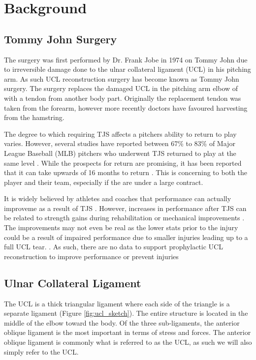 \section {Background}

\subsection{Tommy John Surgery}

The surgery was first performed by Dr. Frank Jobe in 1974 on Tommy John due to irreversible damage done to the ulnar collateral ligament (UCL) in his pitching arm. As such UCL reconstruction surgery has become known as Tommy John surgery. The surgery replaces the damaged UCL in the pitching arm elbow of with a tendon from another body part. Originally the replacement tendon was taken from the forearm, however more recently doctors have favoured harvesting from the hamstring.

The degree to which requiring TJS affects a pitchers ability to return to play varies. However, several studies have reported between 67\% to 83\% of Major League Baseball (MLB) pitchers who underwent TJS returned to play at the same level \cite{Erickson2014} \cite{Cain2010} \cite{Makhni2014}. While the prospects for return are promising, it has been reported that it can take upwards of 16 months to return \cite{Makhni2014}. This is concerning to both the player and their team, especially if the are under a large contract.

It is widely believed by athletes and coaches that performance can actually improveme as a result of TJS \cite{Conte2015}. However, increases in performance after TJS can be related to strength gains during rehabilitation or mechanical improvements \cite{Cain2010}. The improvements may not even be real as the lower stats prior to the injury could be a result of impaired performance due to smaller injuries leading up to a full UCL tear. \cite{Makhni2014}. As such, there are no data to support prophylactic UCL reconstruction to improve performance or prevent injuries \cite{Erickson2014}

\subsection{Ulnar Collateral Ligament}

The UCL is a thick triangular ligament where each side of the triangle is a separate ligament (Figure \ref{fig:ucl_sketch}). The entire structure is located in the middle of the elbow toward the body. Of the three sub-ligaments, the anterior oblique ligament is the most important in terms of stress and forces. The anterior oblique ligament is commonly what is referred to as the UCL, as such we will also simply refer to the UCL.

